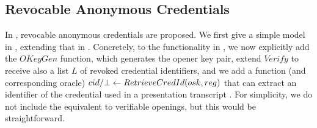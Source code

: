 



\subsection{Revocable Anonymous Credentials}
\label{ssec:related-models-rac}

In \cite{cks10,ckl+15}, revocable anonymous credentials are proposed. We first
give a simple model in , extending that in
. Concretely, to the functionality in
, we now explicitly add the $OKeyGen$ function,
which generates the opener key pair, extend $Verify$ to receive also a list $L$
of revoked credential identifiers, and we add a function (and corresponding
oracle) $cid/\bot \gets RetrieveCredId(osk,reg)$ that can extract an
identifier of the credential used in a presentation transcript \utrans. For
simplicity, we do not include the equivalent to verifiable openings, but this
would be straightforward.

